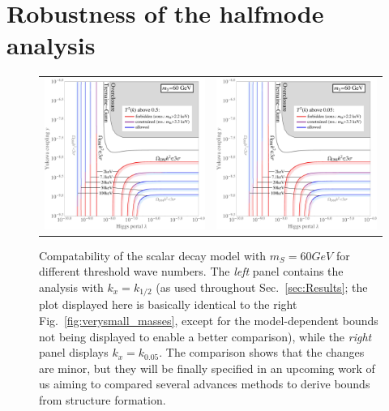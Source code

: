 \section{\label{app:D:HalfmodeThreshold}Robustness of the halfmode analysis}
\renewcommand{\theequation}{D-\arabic{equation}}
\setcounter{equation}{0}  %

\begin{figure}[ht]
\begin{tabular}{lr}\hspace{-1cm}
 \includegraphics[width=8.3cm]{figures/HalfMode_60_until4_relpower0p5.jpeg} & \includegraphics[width=8.3cm]{figures/HalfMode_60_until4_relpower0p05.jpeg}
\end{tabular}
\caption{\label{fig:HalfmodeThreshold}Compatability of the scalar decay model with $m_S=\unit{60}{GeV}$ for different threshold wave numbers. The \emph{left} panel contains the analysis with $k_x=k_{1/2}$ (as used throughout Sec.~\ref{sec:Results}; the plot displayed here is basically identical to the right Fig.~\ref{fig:verysmall_masses}, except for the model-dependent bounds not being displayed to enable a better comparison), while the \emph{right} panel displays $k_x= k_{0.05}$. The comparison shows that the changes are minor, but they will be finally specified in an upcoming work of us aiming to compared several advances methods to derive bounds from structure formation.}
\end{figure}

